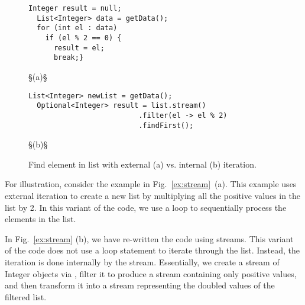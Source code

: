 \documentclass[runningheads,a4paper]{llncs}
\begin{document}
\begin{figure}
  \begin{lstlisting}[mathescape=true]
  Integer result = null;
  List<Integer> data = getData();
  for (int el : data)
    if (el % 2 == 0) {
      result = el; 
      break;}
\end{lstlisting} §\hspace{24em}\small{(a)}§
  \begin{lstlisting}[mathescape=true]
  List<Integer> newList = getData();
  Optional<Integer> result = list.stream()
                          .filter(el -> el % 2)
                          .findFirst();
\end{lstlisting} §\hspace{24em}\small{(b)}§
\caption{Find element in list with external (a) vs. internal (b) iteration.}
\label{ex:find-query}
\end{figure}

For illustration, consider the example in Fig.~\ref{ex:stream}~(a). 
This example uses external iteration to create a new list by multiplying
all the positive values in the list  by 2.  In this variant of the
code, we use a  loop to sequentially process the elements in the
list.

In Fig.~\ref{ex:stream} (b), we have re-written the code using streams. 
This variant of the code does not use a loop statement to iterate through the
list.  Instead, the iteration is done internally by the stream.  Essentially, we
create a stream of Integer objects via , filter it
to produce a stream containing only positive values, and then transform it
into a stream representing the doubled values of the filtered list.
\end{document}
